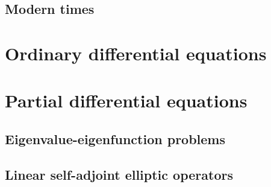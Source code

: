 \subsection{Modern times}

\section{Ordinary differential equations}

\section{Partial differential equations}


\subsection{Eigenvalue-eigenfunction problems}

\subsection{Linear self-adjoint elliptic operators}

\begin{theorem}
\end{theorem}

\begin{theorem}
\end{theorem}

\begin{theorem}
\end{theorem}

\stopchapter
